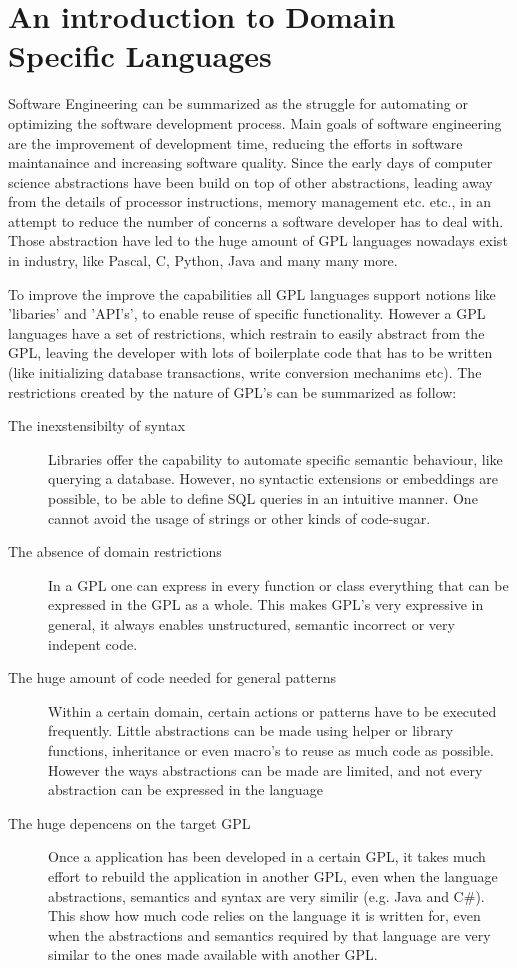 \section{An introduction to Domain Specific Languages}
Software Engineering can be summarized as the struggle for automating or optimizing the software development process. Main goals of software engineering are the improvement of development time, reducing the efforts in software maintanaince and increasing software quality. Since the early days of computer science abstractions have been build on top of other abstractions, leading away from the details of processor instructions, memory management etc. etc., in an attempt to reduce the number of concerns a software developer has to deal with. Those abstraction have led to the huge amount of GPL languages nowadays exist in industry, like Pascal, C, Python, Java and many many more. 

To improve the improve the capabilities all GPL languages support notions like 'libaries' and 'API's', to enable reuse of specific functionality. However a GPL languages have a set of restrictions, which restrain to easily abstract from the GPL, leaving the developer with lots of boilerplate code that has to be written (like initializing database transactions, write conversion mechanims etc). The restrictions created by the nature of GPL's can be summarized as follow:
%
\begin{description}
	\item[The inexstensibilty of syntax]
	Libraries offer the capability to automate specific semantic behaviour, like querying a database. However, no syntactic extensions or embeddings are possible, to be able to define SQL queries in an intuitive manner. One cannot avoid the usage of strings or other kinds of code-sugar. 
	\item[The absence of domain restrictions]
	In a GPL one can express in every function or class everything that can be expressed in the GPL as a whole. This makes GPL's very expressive in general, it always enables unstructured, semantic incorrect or very indepent code.
	\item[The huge amount of code needed for general patterns]
	Within a certain domain, certain actions or patterns have to be executed frequently. Little abstractions can be made using helper or library functions, inheritance or even macro's to reuse as much code as possible. However the ways abstractions can be made are limited, and not every abstraction can be expressed in the language
	\item[The huge depencens on the target GPL]
	Once a application has been developed in a certain GPL, it takes much effort to rebuild the application in another GPL, even when the language abstractions, semantics and syntax are very similir (e.g. Java and C\#). This show how much code relies on the language it is written for, even when the abstractions and semantics required by that language are very similar to the ones made available with another GPL. 
\end{description}


